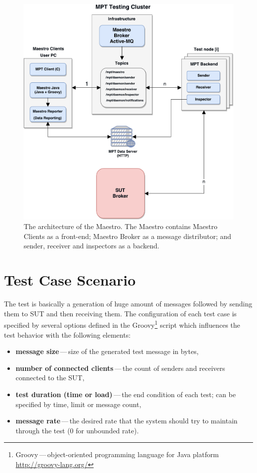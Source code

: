 \begin{figure}[H]
  \centering
  \includegraphics[width=15cm]{obrazky-figures/msg_perf_tool.pdf}
  \caption{The architecture of the Maestro. The Maestro contains Maestro Clients as a front-end; Maestro Broker as a message distributor; and sender, receiver and inspectors as a backend.}
  \label{fig:msg_perf_tool}
\end{figure}

\newpage

\section{Test Case Scenario}
The test is basically a generation of huge amount of messages followed by sending them to SUT and then receiving them. The configuration of each test case is specified by several options defined in the Groovy\footnote{Groovy\,---\,object-oriented programming language for Java platform \url{http://groovy-lang.org/}} script which influences the test behavior with the following elements:

\begin{itemize}
	\setlength\itemsep{0em}
	\item \textbf{message size}\,---\,size of the generated test message in bytes,
	\item \textbf{number of connected clients}\,---\,the count of senders and receivers connected to the SUT,
	\item \textbf{test duration (time or load)}\,---\,the end condition of each test; can be specified by time, limit or message count,
	\item \textbf{message rate}\,---\,the desired rate that the system should try to maintain through the test (0 for unbounded rate).
\end{itemize}

